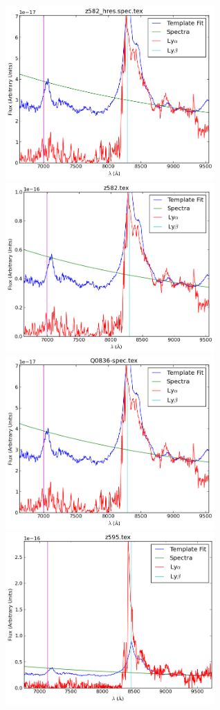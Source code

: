 \documentclass[11pt]{article}
\begin{document}
\begin{figure}[h]
  \centering
  \includegraphics[width=8cm]{z582_hres_spec.png}
  \includegraphics[width=8cm]{z582.png}
  \includegraphics[width=8cm]{Q0836-spec.png}
  \includegraphics[width=8cm]{z595.png}

\end{figure}
\end{document}
